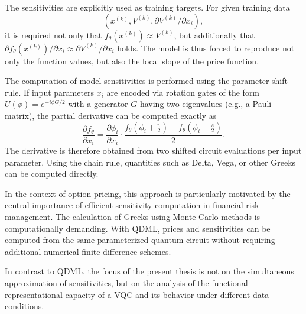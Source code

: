 The sensitivities are explicitly used as training targets. For given training data
\[
(x^{(k)}, V^{(k)}, \partial V^{(k)}/\partial x_i), 
\]
it is required not only that
\( f_\theta(x^{(k)}) \approx V^{(k)} \),
but additionally that
\(
\partial f_\theta(x^{(k)})/\partial x_i
\approx
\partial V^{(k)}/\partial x_i
\)
holds. The model is thus forced to reproduce not only the function values, but also the local slope of the price function.

The computation of model sensitivities is performed using the parameter-shift rule. If input parameters \( x_i \) are encoded via rotation gates of the form \( U(\phi)=e^{-i\phi G/2} \) with a generator \( G \) having two eigenvalues (e.g., a Pauli matrix), the partial derivative can be computed exactly as
\begin{equation}
\frac{\partial f_\theta}{\partial x_i}
=
\frac{\partial \phi_i}{\partial x_i}
\cdot
\frac{
f_\theta(\phi_i+\frac{\pi}{2})
-
f_\theta(\phi_i-\frac{\pi}{2})
}{2}.
\end{equation}
The derivative is therefore obtained from two shifted circuit evaluations per input parameter. Using the chain rule, quantities such as Delta, Vega, or other Greeks can be computed directly.

In the context of option pricing, this approach is particularly motivated by the central importance of efficient sensitivity computation in financial risk management. The calculation of Greeks using Monte Carlo methods is computationally demanding. With QDML, prices and sensitivities can be computed from the same parameterized quantum circuit without requiring additional numerical finite-difference schemes.

In contrast to QDML, the focus of the present thesis is not on the simultaneous approximation of sensitivities, but on the analysis of the functional representational capacity of a VQC and its behavior under different data conditions.